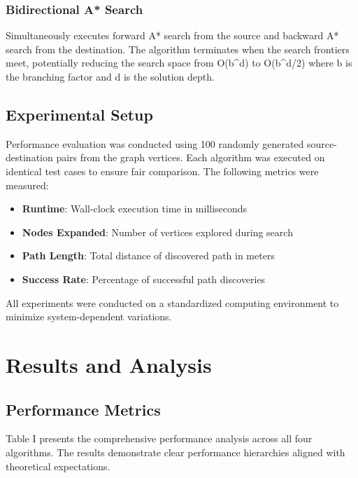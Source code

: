 \documentclass[conference]{IEEEtran}
\begin{document}
\subsubsection{Bidirectional A* Search}
Simultaneously executes forward A* search from the source and backward A* search from the destination. The algorithm terminates when the search frontiers meet, potentially reducing the search space from O(b^d) to O(b^{d/2}) where b is the branching factor and d is the solution depth.

\subsection{Experimental Setup}

Performance evaluation was conducted using 100 randomly generated source-destination pairs from the graph vertices. Each algorithm was executed on identical test cases to ensure fair comparison. The following metrics were measured:

\begin{itemize}
\item \textbf{Runtime}: Wall-clock execution time in milliseconds
\item \textbf{Nodes Expanded}: Number of vertices explored during search
\item \textbf{Path Length}: Total distance of discovered path in meters
\item \textbf{Success Rate}: Percentage of successful path discoveries
\end{itemize}

All experiments were conducted on a standardized computing environment to minimize system-dependent variations.

\section{Results and Analysis}

\subsection{Performance Metrics}

Table I presents the comprehensive performance analysis across all four algorithms. The results demonstrate clear performance hierarchies aligned with theoretical expectations.
\end{document}
